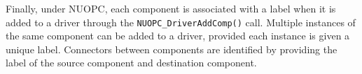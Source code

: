 Finally, under NUOPC, each component is associated with a label when it is added to a driver through the {\tt NUOPC\_DriverAddComp()} call. Multiple instances of the same component can be added to a driver, provided each instance is given a unique label. Connectors between components are identified by providing the label of the source component and destination component.

